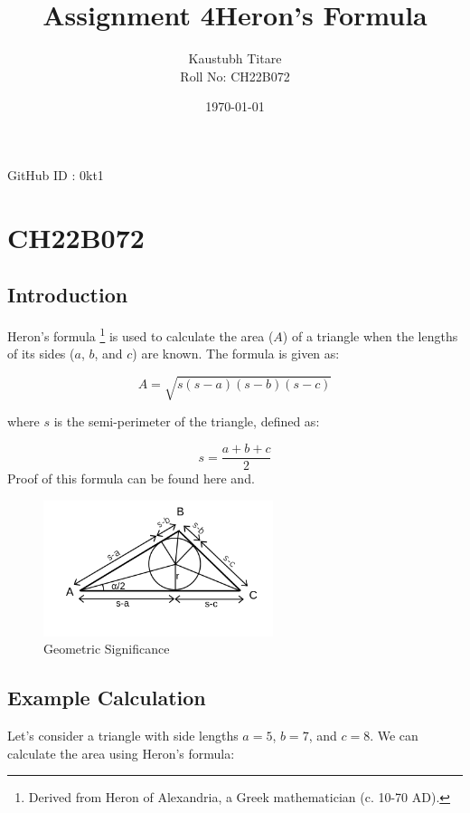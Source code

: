 \documentclass{article}
\title{Assignment 4}
\author{Kaustubh Titare \\ Roll No: CH22B072 }
\date{\today}
\begin{document}
\maketitle

\begin{center}
    GitHub ID : 0kt1
\end{center}
\title{Heron's Formula}

\maketitle

\section{CH22B072}
\subsection{Introduction}
Heron's formula \footnote{Derived from Heron of Alexandria, a Greek mathematician (c. 10-70 AD).} is used to calculate the area ($A$) of a triangle when the lengths of its sides ($a$, $b$, and $c$) are known. The formula is given as:

\[
A = \sqrt{s(s-a)(s-b)(s-c)}
\]

where $s$ is the semi-perimeter of the triangle, defined as:

\[
s = \frac{a+b+c}{2}
\]
Proof of this formula can be found here\cite{AHistoryOfGreekMatheMaticsVol2} and\cite{heronFormula2009}.

\begin{figure}[ht]
  \centering
  \includegraphics[width=0.6\textwidth]{heron.png}
  \caption{Geometric Significance}
\end{figure}

\subsection{Example Calculation}
Let's consider a triangle with side lengths $a = 5$, $b = 7$, and $c = 8$. We can calculate the area using Heron's formula:
\end{document}
